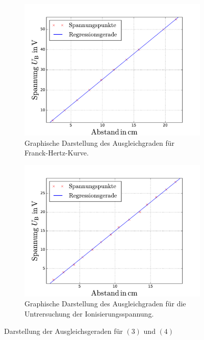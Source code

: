 \begin{figure}
  \centering
  \begin{subfigure}{0.48\textwidth}
    \centering
    \includegraphics[width=1 \textwidth]{../Messdaten/frank_hertz_kuvre.pdf}
    \caption{Graphische Darstellung des Ausgleichgraden für Franck-Hertz-Kurve.}
    \label{fig: frank_hertz}
  \end{subfigure}
  \begin{subfigure}{0.48\textwidth}
    \centering
    \includegraphics[width=1 \textwidth]{../Messdaten/ioni.pdf}
    \caption{Graphische Darstellung des Ausgleichgraden für die Untrersuchung der Ionisierungsspannung.} %
    \label{fig: enrgie_hot}
  \end{subfigure}
  \caption{Darstellung der Ausgleichsgeraden für $(3)$ und $(4)$}
  \label{fig: darstellung_2}
\end{figure}

